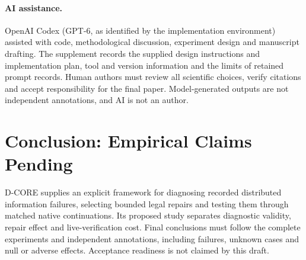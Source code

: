 \documentclass[sigconf,anonymous]{aamas}
\begin{document}
\paragraph{AI assistance.}
OpenAI Codex (GPT-6, as identified by the implementation environment) assisted with code, methodological discussion, experiment design and manuscript drafting. The supplement records the supplied design instructions and implementation plan, tool and version information and the limits of retained prompt records. Human authors must review all scientific choices, verify citations and accept responsibility for the final paper. Model-generated outputs are not independent annotations, and AI is not an author.

\section{Conclusion: Empirical Claims Pending}
D-CORE supplies an explicit framework for diagnosing recorded distributed information failures, selecting bounded legal repairs and testing them through matched native continuations. Its proposed study separates diagnostic validity, repair effect and live-verification cost. Final conclusions must follow the complete experiments and independent annotations, including failures, unknown cases and null or adverse effects. Acceptance readiness is not claimed by this draft.



\end{document}
